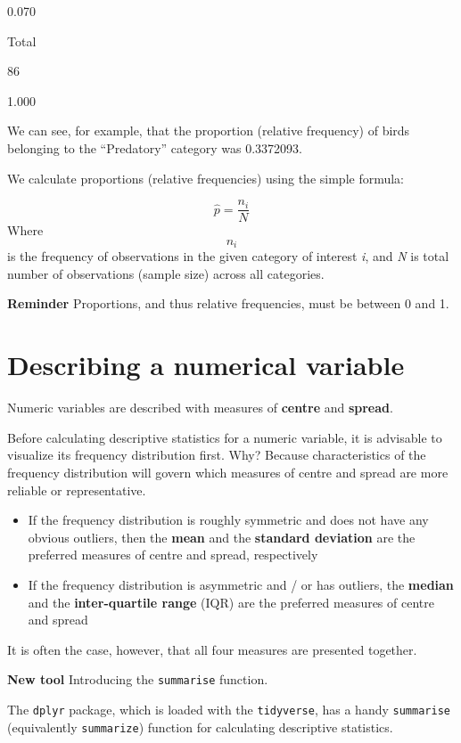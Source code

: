 \documentclass[
]{book}
\begin{document}
0.070

Total

86

1.000

We can see, for example, that the proportion (relative frequency) of birds belonging to the ``Predatory'' category was 0.3372093.

We calculate proportions (relative frequencies) using the simple formula:

\[\hat{p} = \frac{n_i}{N}\]
Where \[n_i\] is the frequency of observations in the given category of interest \emph{i}, and \emph{N} is total number of observations (sample size) across all categories.

\textbf{Reminder}
Proportions, and thus relative frequencies, must be between 0 and 1.

\section{Describing a numerical variable}\label{desc_numeric_var}

Numeric variables are described with measures of \textbf{centre} and \textbf{spread}.

Before calculating descriptive statistics for a numeric variable, it is advisable to visualize its frequency distribution first. Why? Because characteristics of the frequency distribution will govern which measures of centre and spread are more reliable or representative.

\begin{itemize}
\item
  If the frequency distribution is roughly symmetric and does not have any obvious outliers, then the \textbf{mean} and the \textbf{standard deviation} are the preferred measures of centre and spread, respectively
\item
  If the frequency distribution is asymmetric and / or has outliers, the \textbf{median} and the \textbf{inter-quartile range} (IQR) are the preferred measures of centre and spread
\end{itemize}

It is often the case, however, that all four measures are presented together.

\textbf{New tool}
Introducing the \texttt{summarise} function.

The \texttt{dplyr} package, which is loaded with the \texttt{tidyverse}, has a handy \texttt{summarise} (equivalently \texttt{summarize}) function for calculating descriptive statistics.
\end{document}
